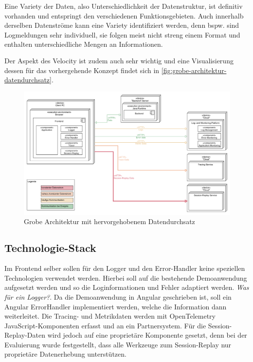 Eine Variety der Daten, also Unterschiedlichkeit der Datenstruktur, ist definitiv vorhanden und entspringt den verschiedenen Funktionsgebieten. Auch innerhalb derselben Datenströme kann eine Variety identifiziert werden, denn bspw. sind Logmeldungen sehr individuell, sie folgen meist nicht streng einem Format und enthalten unterschiedliche Mengen an Informationen.

Der Aspekt des Velocity ist zudem auch sehr wichtig und eine Visualisierung dessen für das vorhergehende Konzept findet sich in \autoref{fig:grobe-architektur-datendurchsatz}.
	
\begin{figure}[H]
	\centering
	\includegraphics[width=0.75\linewidth]{img/04_erstellung-poc/konzept-datendurchsatz.png}
	\caption{Grobe Architektur mit hervorgehobenem Datendurchsatz}
	\label{fig:grobe-architektur-datendurchsatz}
\end{figure}

\pagebreak

	\subsection{Technologie-Stack}
	\label{sec:technologie-stack}

	Im Frontend selber sollen für den Logger und den Error-Handler keine speziellen Technologien verwendet werden. Hierbei soll auf die bestehende Demoanwendung aufgesetzt werden und so die Loginformationen und Fehler adaptiert werden. \textit{\color{red}Was für ein Logger?}. Da die Demoanwendung in Angular geschrieben ist, soll ein Angular ErrorHandler implementiert werden, welche die Information dann weiterleitet. Die Tracing- und Metrikdaten werden mit OpenTelemetry JavaScript-Komponenten erfasst und an ein Partnersystem. Für die Session-Replay-Daten wird jedoch auf eine proprietäre Komponente gesetzt, denn bei der Evaluierung wurde festgestellt, dass alle Werkzeuge zum Session-Replay nur proprietäre Datenerhebung unterstützen.
	
